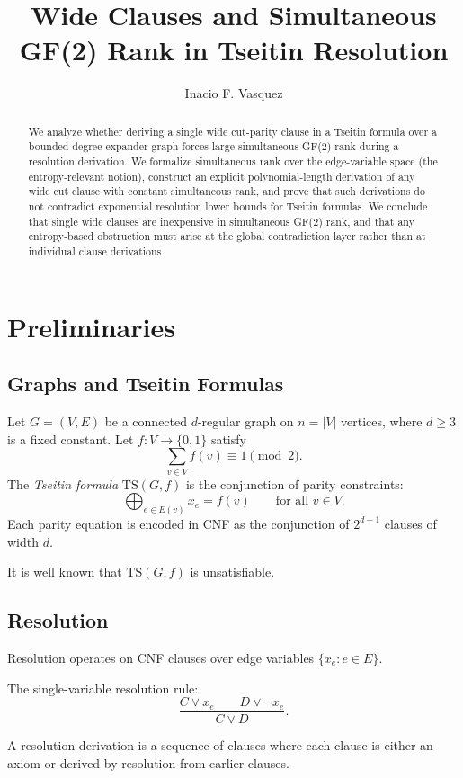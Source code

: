 \documentclass[11pt]{article}
\title{Wide Clauses and Simultaneous GF(2) Rank in Tseitin Resolution}
\author{Inacio F. Vasquez}
\date{}
\begin{document}
\maketitle

\begin{abstract}
We analyze whether deriving a single wide cut-parity clause in a Tseitin formula over a bounded-degree expander graph forces large simultaneous GF(2) rank during a resolution derivation. We formalize simultaneous rank over the edge-variable space (the entropy-relevant notion), construct an explicit polynomial-length derivation of any wide cut clause with constant simultaneous rank, and prove that such derivations do not contradict exponential resolution lower bounds for Tseitin formulas. We conclude that single wide clauses are inexpensive in simultaneous GF(2) rank, and that any entropy-based obstruction must arise at the global contradiction layer rather than at individual clause derivations.
\end{abstract}

\section{Preliminaries}

\subsection{Graphs and Tseitin Formulas}

Let $G=(V,E)$ be a connected $d$-regular graph on $n=|V|$ vertices, where $d\ge 3$ is a fixed constant. Let $f:V\to\{0,1\}$ satisfy
\[
\sum_{v\in V} f(v) \equiv 1 \pmod 2.
\]
The \emph{Tseitin formula} $\mathrm{TS}(G,f)$ is the conjunction of parity constraints:
\[
\bigoplus_{e\in E(v)} x_e = f(v)
\qquad \text{for all } v\in V.
\]
Each parity equation is encoded in CNF as the conjunction of $2^{d-1}$ clauses of width $d$.

It is well known that $\mathrm{TS}(G,f)$ is unsatisfiable.

\subsection{Resolution}

Resolution operates on CNF clauses over edge variables $\{x_e : e\in E\}$.

The single-variable resolution rule:
\[
\frac{C \lor x_e \qquad D \lor \neg x_e}{C \lor D}.
\]

A resolution derivation is a sequence of clauses where each clause is either an axiom or derived by resolution from earlier clauses.
\end{document}
